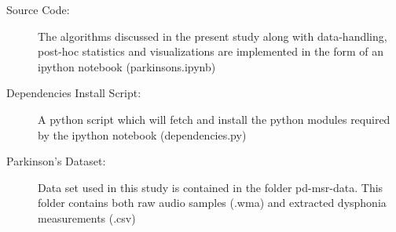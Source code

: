 \documentclass[12pt]{article}
\begin{document}
\begin{description}

\item[Source Code:] The algorithms discussed in the present study along with data-handling, post-hoc statistics and visualizations are implemented in the form of an ipython notebook (parkinsons.ipynb)

\item[Dependencies Install Script:] A python script which will fetch and install the  python modules required by the ipython notebook (dependencies.py)

\item[Parkinson's Dataset:] Data set used in this study is contained in the folder pd-msr-data. This folder contains both raw audio samples (.wma) and extracted dysphonia measurements (.csv)

\end{description}



\end{document}
